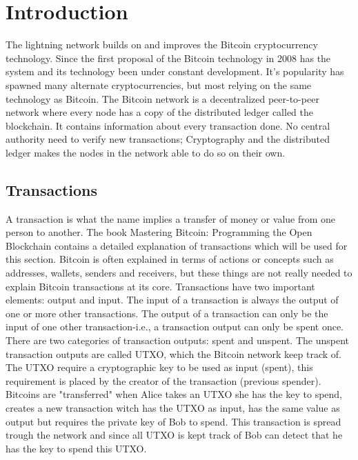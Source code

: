 \documentclass[informationsecurity]{gucmasterproject}
\begin{document}


\chapter{Introduction}

The lightning network builds on and improves the Bitcoin cryptocurrency technology. 
Since the first proposal of the Bitcoin technology in 2008\cite{nakamoto2008bitcoin} has the system and its technology been under constant development. It's popularity has spawned many alternate cryptocurrencies, but most relying on the same technology as Bitcoin. The Bitcoin network is a decentralized peer-to-peer network where every node has a copy of the distributed ledger called the blockchain. It contains information about every transaction done. No central authority need to verify new transactions; Cryptography and the distributed ledger makes the nodes in the network able to do so on their own.

\section{Transactions}
A transaction is what the name implies a transfer of money or value from one person to another. The book Mastering Bitcoin: Programming the Open Blockchain \cite{antonopoulos2017mastering} contains a detailed explanation of transactions which will be used for this section. Bitcoin is often explained in terms of actions or concepts such as addresses, wallets, senders and receivers, but these things are not really needed to explain Bitcoin transactions at its core. Transactions have two important elements: output and input. The input of a transaction is always the output of one or more other transactions. The output of a transaction can only be the input of one other transaction-i.e., a transaction output can only be spent once. There are two categories of transaction outputs: spent and unspent. The unspent transaction outputs are called UTXO, which the Bitcoin network keep track of. The UTXO require a cryptographic key to be used as input (spent), this requirement is placed by the creator of the transaction (previous spender). Bitcoins are "transferred" when Alice takes an UTXO she has the key to spend, creates a new transaction witch has the UTXO as input, has the same value as output but requires the private key of Bob to spend. This transaction is spread trough the network and since all UTXO is kept track of Bob can detect that he has the key to spend this UTXO.
\end{document}

